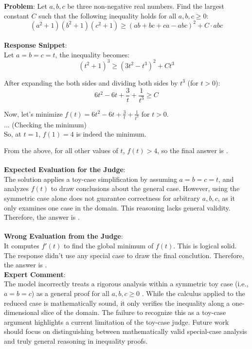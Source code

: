 \begin{examplebox}
\textbf{Problem}: Let $a, b, c$ be three non-negative real numbers. Find the largest constant $C$ such that the following inequality holds for all $a, b, c \geq 0$:
$$
\left(a^2+1\right)\left(b^2+1\right)\left(c^2+1\right) \geq (ab+bc+ca-abc)^2 + C \cdot abc
$$
\\
\textbf{Response Snippet}: \\
Let \( a = b = c = t \), the inequality becomes:
\[
(t^2+1)^3 \geq (3t^2-t^3)^2 + C t^3
\]

After expanding the both sides and dividing both sides by \( t^3 \) (for \( t > 0 \)):
\[
6t^2 - 6t + \frac{3}{t} + \frac{1}{t^3} \geq C
\]

Now, let's minimize \( f(t) = 6t^2 - 6t + \frac{3}{t} + \frac{1}{t^3} \) for \( t > 0 \).\\

... (Checking the minimum)\\

So, at \( t = 1 \), \( f(1) = 4 \) is indeed the minimum.

From the above, for all other values of \( t \), \( f(t) > 4 \), so the final answer is .
\\\\
\textbf{Expected Evaluation for the Judge}:
\\
The solution applies a toy-case simplification by assuming $a = b = c = t$, and analyzes $f(t)$ to draw conclusions about the general case. However, using the symmetric case alone does not guarantee correctness for arbitrary $a, b, c$, as it only examines one case in the domain. This reasoning lacks general validity. Therefore, the answer is .
\\\\
\textbf{Wrong Evaluation from the Judge}: \\
 It computes \(f'(t)\) to find the global minimum of $f(t)$. This is logical solid. The response didn't use any special case to draw the final conclution. Therefore, the answer is .
\\

\textbf{Expert Comment}: \\
The model incorrectly treats a rigorous analysis within a symmetric toy case (i.e., $a = b = c$) as a general proof for all $a, b, c \geq 0$ \wronghl. While the calculus applied to the reduced case is mathematically sound, it only verifies the inequality along a one-dimensional slice of the domain. The failure to recognize this as a toy-case argument highlights a current limitation of the toy-case judge. Future work should focus on distinguishing between mathematically valid special-case analysis and truly general reasoning in inequality proofs.

\end{examplebox}